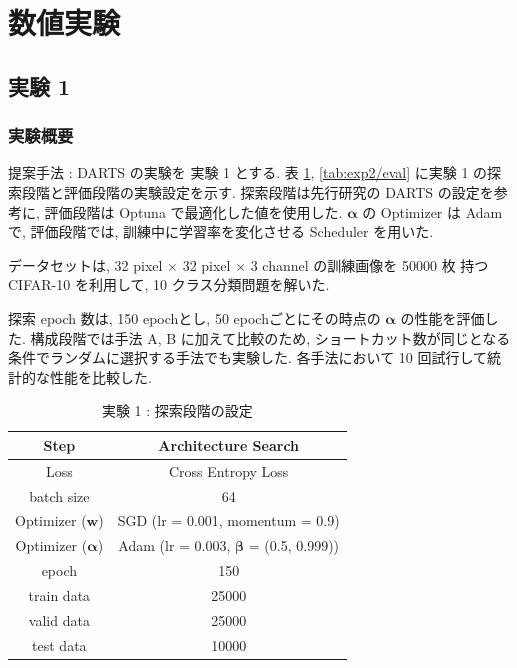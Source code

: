 \newpage
\changeindent{0cm}
\section{数値実験}
\label{sec:exp}
\changeindent{2cm}


\changeindent{0cm}
\subsection{実験 1}
\label{sec:exp.01}
\changeindent{2cm}


\changeindent{0cm}
\subsubsection{実験概要}
\label{sec:exp.01_01}
\changeindent{2cm}

提案手法 : DARTS の実験を 実験 1 とする.
表 \ref{tab:setting_exp}, \ref{tab:exp2/eval} に実験 1 の探索段階と評価段階の実験設定を示す.
探索段階は先行研究の DARTS の設定を参考に, 評価段階は Optuna で最適化した値を使用した.
$\bm{\alpha}$ の Optimizer は Adam\cite{Kingma2015AdamAM} で,
評価段階では, 訓練中に学習率を変化させる Scheduler\cite{Loshchilov2017SGDRSG} を用いた.

データセットは, 32 pixel $\times$ 32 pixel $\times$ 3 channel の訓練画像を 50000 枚 持つ CIFAR-10\cite{cifar10} を利用して,
10 クラス分類問題を解いた.

探索 epoch 数は, 150 epochとし, 50 epochごとにその時点の $\bm{\alpha}$ の性能を評価した.
構成段階では手法 A, B に加えて比較のため,
ショートカット数が同じとなる条件でランダムに選択する手法でも実験した.
各手法において 10 回試行して統計的な性能を比較した.

\clearpage
\begin{table}[tb]
  \begin{center}
    \caption{実験 1 : 探索段階の設定}
  	\vspace{3mm}
    \begin{tabular}{|c|c|} \hline
      Step & Architecture Search \\ \hline\hline
      Loss & Cross Entropy Loss \\ \hline
      batch size & 64 \\ \hline
      Optimizer ($\bm{w}$) & SGD (lr = 0.001, momentum = 0.9) \\ \hline
      Optimizer ($\bm{\alpha}$) & Adam (lr = 0.003, $\bm{\beta}$ = (0.5, 0.999)) \\ \hline
      epoch & 150\\ \hline
      train data & 25000\\ \hline
      valid data & 25000\\ \hline
      test data &  10000\\ \hline
    \end{tabular}
    \label{tab:setting_exp}
  \end{center}
\end{table}

